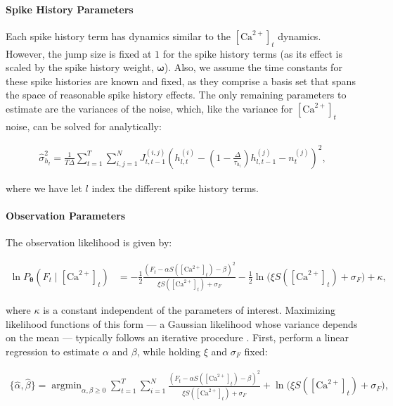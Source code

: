 \documentclass[10pt]{article}
\providecommand{\ve}[1]{\boldsymbol{#1}}
\providecommand{\ve}[1]{\boldsymbol{#1}}
\DeclareMathOperator*{\argmin}{argmin}
\newcommand{\thetn}{\ve{\theta}}
\newcommand{\p}{P_{\thetn}}
\newcommand{\Ca}{[\text{Ca}^{2+}]}
\begin{document}
\paragraph{Spike History Parameters}

Each spike history term has dynamics similar to the $\Ca_t$ dynamics. However, the jump size is fixed at $1$ for the spike history terms (as its effect is scaled by the spike history weight, $\ve{\omega}$). Also, we assume the time constants for these spike histories are known and fixed, as they comprise a basis set that spans the space of reasonable spike history effects.  The only remaining parameters to estimate are the variances of the noise, which, like the variance for $\Ca_t$ noise, can be solved for analytically:

\begin{align}
\widehat{\sigma}_{h_l}^2 = \frac{1}{T \Delta} \sum_{t=1}^T \sum_{i,j=1}^N J^{(i,j)}_{t,t-1} \left(h_{l,t}^{(i)} - (1 - \frac{\Delta}{\tau_{h_l}}) h_{l,t-1}^{(j)} -  n_t^{(j)}\right)^2,
\end{align}

\noindent where we have let $l$ index the different spike history terms.

\paragraph{Observation Parameters}

The observation likelihood is given by:

\begin{align} \label{eq:obs_lik2}
\ln \p(F_t \mid \Ca_t) &= -\frac{1}{2} \frac{(F_t-\alpha S(\Ca_t) - \beta)^2}{\xi S(\Ca_t) + \sigma_F} -\frac{1}{2} \ln \big(\xi S(\Ca_t) + \sigma_F) + \kappa,
\end{align}

\noindent where $\kappa$ is a constant independent of the parameters of interest. Maximizing likelihood functions of this form --- a Gaussian likelihood whose variance depends on the mean --- typically follows an iterative procedure  \cite{ShumwayStoffer06}.  First, perform a linear regression to estimate $\alpha$ and $\beta$, while holding $\xi$ and $\sigma_F$ fixed:

\begin{align} \label{eq:ab}
\{\widehat{\alpha}, \widehat{\beta}\} = \argmin_{\alpha, \beta \geq 0} \sum_{t=1}^T \sum_{i=1}^N  \frac{(F_t-\alpha S(\Ca_t) - \beta)^2}{\xi S(\Ca_t) + \sigma_F} + \ln\big(\xi S(\Ca_t) + \sigma_F\big),
\end{align}
\end{document}
